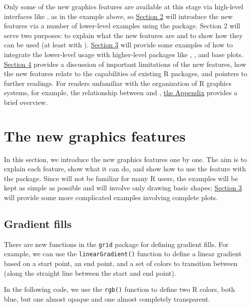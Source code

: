 Only some of the new graphics features are available at this stage
via high-level interfaces
like , as in the example above, so \protect\hyperlink{new-features}{Section 2}
will introduce the new features via a number of lower-level
examples using the  package.
Section 2 will serve two purposes: to explain what the new features
are and to show how they can be used (at least with ).
\protect\hyperlink{integration}{Section 3} will provide some examples of how to
integrate the lower-level  usage with higher-level packages
like , , and base  plots.
\protect\hyperlink{discussion}{Section 4} provides a discussion of important limitations
of the new features, how the new features relate to the capabilities
of existing R packages, and pointers to further readings.
For readers unfamiliar with the organization of R graphics systems,
for example, the relationship between  and ,
\protect\hyperlink{rgraphics}{the Appendix} provides a brief overview.

\hypertarget{new-features}{%
\section{The new graphics features}\label{new-features}}

In this section, we introduce the new graphics features one by one.
The aim is to explain each feature, show what it can do, and show
how to use the feature with the  package.
Since  will not be familiar for many R users,
the examples will be kept as simple as possible and will involve only drawing
basic shapes; \protect\hyperlink{integration}{Section 3} will provide some more
complicated examples involving complete plots.

\hypertarget{gradient-fills}{%
\subsection{Gradient fills}\label{gradient-fills}}

There are new functions in the \texttt{grid} package for
defining gradient fills. For example,
we can use the \texttt{linearGradient()} function to
define a linear gradient based on a start point, an end point,
and a set of colors to transition between (along the straight
line between the start and end point).

In the following code, we use the \texttt{rgb()} function to
define two R colors, both blue, but one
almost opaque and one almost completely transparent.

